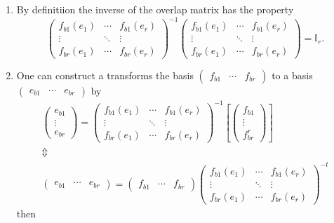 \documentclass[aps,preprint]{revtex4}
\begin{document}
\begin{enumerate}
\item By definitiion the inverse of the overlap matrix has the property 
\begin{equation}
\left( 
\begin{array}{ccc}
f_{b1}\left( e_{1}\right) & \cdots & f_{b1}\left( e_{r}\right) \\ 
\vdots & \ddots & \vdots \\ 
f_{br}\left( e_{1}\right) & \cdots & f_{br}\left( e_{r}\right)%
\end{array}%
\right) ^{-1}\left( 
\begin{array}{ccc}
f_{b1}\left( e_{1}\right) & \cdots & f_{b1}\left( e_{r}\right) \\ 
\vdots & \ddots & \vdots \\ 
f_{br}\left( e_{1}\right) & \cdots & f_{br}\left( e_{r}\right)%
\end{array}%
\right) =\mathbb{I}_{r}.
\end{equation}

\item One can construct a transforms the basis $\left( 
\begin{array}{ccc}
f_{b1} & \cdots & f_{br}%
\end{array}%
\right) $ to a basis $\left( 
\begin{array}{ccc}
e_{b1} & \cdots & e_{br}%
\end{array}%
\right) $ by 
\begin{gather}
\left( 
\begin{array}{c}
e_{b1} \\ 
\vdots \\ 
e_{br}%
\end{array}%
\right) =\left( 
\begin{array}{ccc}
f_{b1}\left( e_{1}\right) & \cdots & f_{b1}\left( e_{r}\right) \\ 
\vdots & \ddots & \vdots \\ 
f_{br}\left( e_{1}\right) & \cdots & f_{br}\left( e_{r}\right)%
\end{array}%
\right) ^{-1}\left[ \left( 
\begin{array}{c}
f_{b1} \\ 
\vdots \\ 
f_{br}^{r}%
\end{array}%
\right) \right] \\
\Updownarrow \\
\left( 
\begin{array}{ccc}
e_{b1} & \cdots & e_{br}%
\end{array}%
\right) =\left( 
\begin{array}{ccc}
f_{b1} & \cdots & f_{br}%
\end{array}%
\right) \left( 
\begin{array}{ccc}
f_{b1}\left( e_{1}\right) & \cdots & f_{b1}\left( e_{r}\right) \\ 
\vdots & \ddots & \vdots \\ 
f_{br}\left( e_{1}\right) & \cdots & f_{br}\left( e_{r}\right)%
\end{array}%
\right) ^{-t}
\end{gather}%
then


\end{enumerate}
\end{document}
